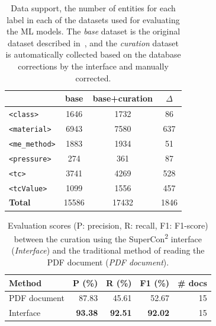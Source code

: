 \documentclass[]{interact}
\theoremstyle{plain} %
\theoremstyle{definition}
\theoremstyle{remark}
\begin{document}
\begin{table}[ht]
\centering
\small
\caption{Data support, the number of entities for each label in each of the datasets used for evaluating the ML models. The \emph{base} dataset is the original dataset described in~\cite{foppiano2021supermat}, and the \emph{curation} dataset is automatically collected based on the database corrections by the interface and manually corrected.}
\begin{tabular}{lccc}
\toprule
                        & \textbf{base}     & \textbf{base+curation}    & \textbf{$\Delta$}  \\ 
\midrule
\texttt{<class>}        & 1646              & 1732                      &  86                \\
\texttt{<material>}     & 6943              & 7580                      &  637               \\
\texttt{<me\_method>}   & 1883              & 1934                      &  51                \\
\texttt{<pressure>}     & 274               & 361                       &  87                \\
\texttt{<tc>}           & 3741              & 4269                      &  528               \\
\texttt{<tcValue>}      & 1099              & 1556                      &  457               \\
\midrule
\textbf{Total}          & 15586             & 17432                     & 1846               \\ 
\bottomrule
\end{tabular}
\label{tab:training-support}
\end{table}


\begin{table}[ht]
\centering\small
\caption{Evaluation scores (P: precision, R: recall, F1: F1-score) between the curation using the SuperCon\textsuperscript{2} interface (\textit{Interface}) and the traditional method of reading the PDF document (\textit{PDF document}). }
\begin{tabular}{lrrrr}
\toprule
    \textbf{Method}    & \textbf{P (\%)}   & \textbf{R (\%)}   & \textbf{F1 (\%)}  & \textbf{\# docs}   \\
    \midrule
    PDF document    & 87.83             & 45.61             & 52.67             & 15        \\
    Interface       & \textbf{93.38}    & \textbf{92.51}    & \textbf{92.02}    & 15        \\
    \bottomrule
\end{tabular}
\label{tab:evaluation-interface-correction}
\end{table}
\end{document}
